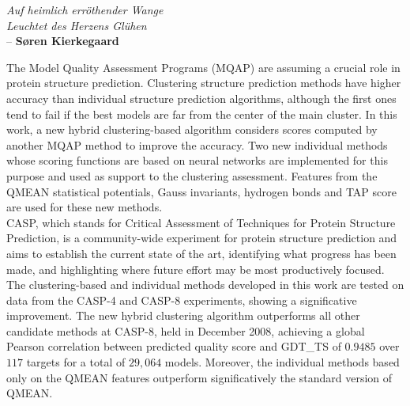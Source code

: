 \documentclass[12pt,a4paper,twoside,openright,titlepage]{book}
\let\origcleardoublepage\cleardoublepage
\newcommand{\clearemptydoublepage}{
  \clearpage
  {\pagestyle{empty}\origcleardoublepage}
}
\let\cleardoublepage\clearemptydoublepage
\newcommand{\fncyblank}{\fancyhf{}}
\begin{document}
 	\pagestyle{headings}
	\begin{frontispiece}
	\end{frontispiece}
	
	\onehalfspacing
	
	\begin{flushright}
		\cleardoublepage\null{}
		\emph{Auf heimlich err\"othender Wange\\
		Leuchtet des Herzens Gl\"uhen}\\
		-- \textbf{S{\o}ren Kierkegaard}
		\null
	\end{flushright}
	
	
	
	\newenvironment{abstract}
	{\cleardoublepage\fncyblank\null\vfill\begin{center}
	\bfseries\abstractname
	\end{center}}
	{\vfill\null}
	\begin{abstract}
The Model Quality Assessment Programs (MQAP) are assuming a crucial role in protein structure prediction. Clustering structure prediction methods have higher accuracy than individual structure prediction algorithms, although the first ones tend to fail if the best models are far from the center of the main cluster. In this work, a new hybrid clustering-based algorithm considers scores computed by another MQAP method to improve the accuracy. Two new individual methods whose scoring functions are based on neural networks are implemented for this purpose and used as support to the clustering assessment. Features from the QMEAN statistical potentials, Gauss invariants, hydrogen bonds and TAP score are used for these new methods. \\
CASP, which stands for Critical Assessment of Techniques for Protein Structure Prediction, is a community-wide experiment for protein structure prediction and aims to establish the current state of the art, identifying what progress has been made, and highlighting where future effort may be most productively focused. The clustering-based and individual methods developed in this work are tested on data from the CASP-4 and CASP-8 experiments, showing a significative improvement. The new hybrid clustering algorithm outperforms all other candidate methods at CASP-8, held in December 2008, achieving a global Pearson correlation between predicted quality score and GDT\_TS of $0.9485$ over $117$ targets for a total of $29,064$ models. Moreover, the individual methods based only on the QMEAN features outperform significatively the standard version of QMEAN.	
\end{abstract}
	
\end{document}
